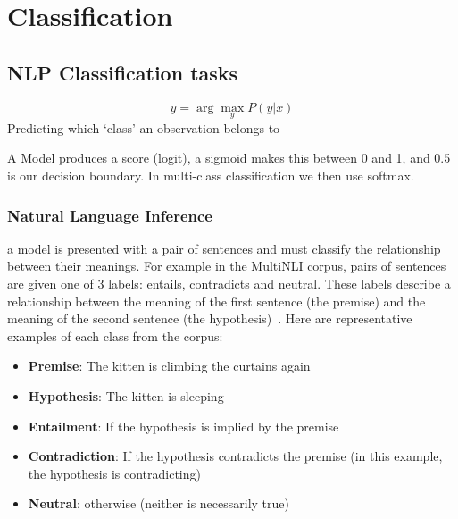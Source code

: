 \documentclass[11pt]{article}
\begin{document}


\tableofcontents

\clearpage

\section{Classification}

\subsection{NLP Classification tasks}

\begin{definition}[Classification]
    \begin{equation}
        \hat{y} = \arg\max_y P(y|x)    
    \end{equation}
    Predicting which `class' an observation belongs to
\end{definition}

A Model produces a score (logit), a sigmoid makes this between 0 and 1, and 0.5 is our decision boundary. In multi-class classification we then use softmax.

\subsubsection{Natural Language Inference}

a model is presented with a pair of sentences and must classify the relationship between their meanings. For example in the MultiNLI corpus, pairs of sentences are given one of 3 labels: entails, contradicts and neutral. These labels describe a relationship between the meaning of the first sentence (the premise) and the meaning of the second sentence (the hypothesis)~\cite{book-speech-and-language-processing}. Here are representative examples of each class from the corpus:

\begin{itemize}
    \item \textbf{Premise}: The kitten is climbing the curtains again
    \item \textbf{Hypothesis}: The kitten is sleeping
    \item \textbf{Entailment}: If the hypothesis is implied by the premise
    \item \textbf{Contradiction}: If the hypothesis contradicts the premise (in this example, the hypothesis is contradicting)
    \item \textbf{Neutral}: otherwise (neither is necessarily true)
\end{itemize}
\end{document}
